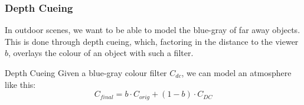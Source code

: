 \documentclass{panikzettel}
\begin{document}
\begin{halfboxl}
\vspace{-\baselineskip}
\subsubsection*{Depth Cueing}

In outdoor scenes, we want to be able to model the blue-gray of far away objects. This is done through depth cueing, which, factoring in the distance to the viewer $b$, overlays the colour of an object with such a filter.
\end{halfboxl}%
\begin{halfboxr}
\vspace{-\baselineskip}
\begin{defi}{Depth Cueing}
Given a blue-gray colour filter $C_{dc}$, we can model an atmosphere like this:
$$C_{final} = b \cdot C_{orig} + (1-b) \cdot C_{DC}$$
\end{defi}
\end{halfboxr}
\end{document}
